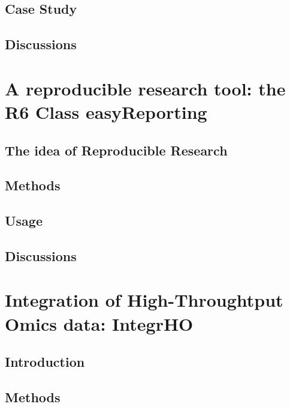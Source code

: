 \documentclass[a4paper, oneside, british, intoc, bibliograph=totoc, index=totoc, BCOR10mm, twoside, openright]{book}
\numberwithin{equation}{section}
\numberwithin{figure}{section}
\begin{document}
\section{Case Study} \label{sec:descan2results}

\section{Discussions} \label{sec:descan2next}



\chapter{A reproducible research tool: the R6 Class easyReporting}

\section{The idea of Reproducible Research}

\section{Methods}

\section{Usage}

\section{Discussions}



\chapter{Integration of High-Throughtput Omics data: IntegrHO} \label{sec:integrhocap}

\section{Introduction} \label{sec:integrhointro}

\section{Methods}  \label{sec:integrhometh}

\end{document}
